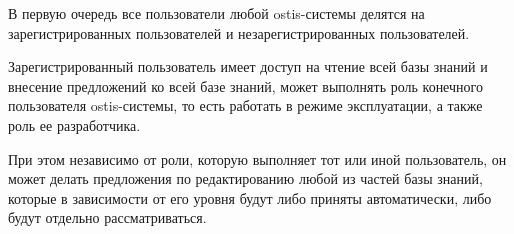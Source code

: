 В первую очередь все пользователи любой ostis-системы делятся на зарегистрированных пользователей и незарегистрированных пользователей.

\begin{SCn}

\begin{scnindent}
	\begin{scneqtoset}
	\end{scneqtoset}
\end{scnindent}
\end{SCn}

Зарегистрированный пользователь имеет доступ на чтение всей базы знаний и внесение предложений ко всей базе знаний, может выполнять роль конечного пользователя ostis-системы, то есть работать в режиме эксплуатации, а также роль ее разработчика. 

При этом независимо от роли, которую выполняет тот или иной пользователь, он может делать предложения по редактированию любой из частей базы знаний, которые в зависимости от его уровня будут либо приняты автоматически, либо будут отдельно рассматриваться.


